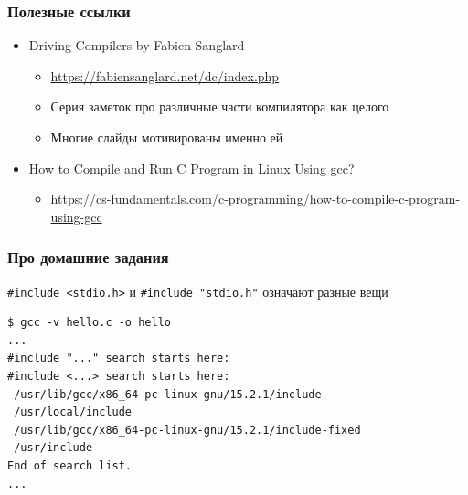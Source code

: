 \documentclass[aspectratio=169]{beamer}
\begin{document}
\begin{frame}
    \frametitle{Полезные ссылки}

    \begin{itemize}
        \item Driving Compilers by Fabien Sanglard
              \begin{itemize}
                  \item \url{https://fabiensanglard.net/dc/index.php}
                  \item Серия заметок про различные части компилятора как целого
                  \item Многие слайды мотивированы именно ей
              \end{itemize}
        \item How to Compile and Run C Program in Linux Using gcc?
              \begin{itemize}
                  \item \url{https://cs-fundamentals.com/c-programming/how-to-compile-c-program-using-gcc}
              \end{itemize}
    \end{itemize}

\end{frame}

\appendix

\begin{frame}[fragile]
    \frametitle{Про домашние задания}

    \texttt{\#include <stdio.h>} и \texttt{\#include "stdio.h"} означают разные вещи

    \vspace{1em}

    \begin{verbatim}
$ gcc -v hello.c -o hello
...
#include "..." search starts here:
#include <...> search starts here:
 /usr/lib/gcc/x86_64-pc-linux-gnu/15.2.1/include
 /usr/local/include
 /usr/lib/gcc/x86_64-pc-linux-gnu/15.2.1/include-fixed
 /usr/include
End of search list.
...
    \end{verbatim}
\end{frame}
\end{document}
